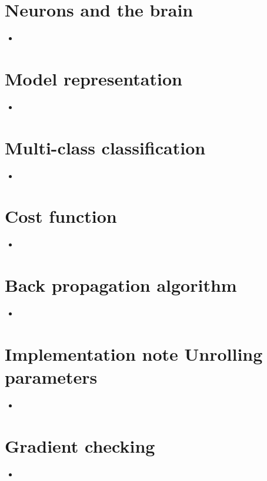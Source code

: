 \documentclass[13pt]{book}
\begin{document}
\section{Neurons and the brain}
\begin{itemize}
  \item
\end{itemize}

\section{Model representation}
\begin{itemize}
  \item
\end{itemize}

\section{Multi-class classification}
\begin{itemize}
  \item
\end{itemize}

\section{Cost function}
\begin{itemize}
  \item
\end{itemize}

\section{Back propagation algorithm}
\begin{itemize}
  \item
\end{itemize}

\section{Implementation note Unrolling parameters}
\begin{itemize}
  \item
\end{itemize}

\section{Gradient checking}
\begin{itemize}
  \item
\end{itemize}
\end{document}
